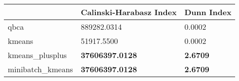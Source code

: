 \begin{table}[htbp]
\centering
\begin{tabular}{lll}
\toprule
 & Calinski-Harabasz Index & Dunn Index \\
\midrule
qbca & 889282.0314 & 0.0002 \\
kmeans & 51917.5500 & 0.0002 \\
kmeans_plusplus & \textbf{37606397.0128} & \textbf{2.6709} \\
minibatch_kmeans & \textbf{37606397.0128} & \textbf{2.6709} \\
\bottomrule
\end{tabular}
\end{table}
